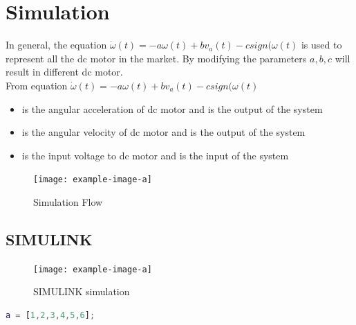 \documentclass[12pt,a4paper]{article}
\begin{document}
	\section{Simulation}
	
	In general, the equation \(\dot{\omega}(t) = - a\omega(t) + bv_a(t) - csign(\omega(t)\) is used to represent all the dc motor in the market. By modifying the parameters \(a, b, c\) will result in different dc motor.\\
	
	From equation \(\dot{\omega}(t) = - a\omega(t) + bv_a(t) - csign(\omega(t)\)
	\begin{itemize}
		\item { is the angular acceleration of dc motor and is the output of the system}
		\item { is the angular velocity of dc motor and is the output of the system}
		\item { is the input voltage to dc motor and is the input of the system}
	\end{itemize}
	
	\begin{figure}[ht]
		\centering
		\texttt{[image: example-image-a]}
		\caption{Simulation Flow}
		\label{fig:Simulation Flow}
	\end{figure}
	
	\subsection{SIMULINK}
	
	\begin{figure}[ht]
		\centering
		\texttt{[image: example-image-a]}
		\caption{SIMULINK simulation}
		\label{fig:SIMULINK simulation}
	\end{figure}
	
	\begin{lstlisting}[language=MATLAB]
		a = [1,2,3,4,5,6];
	\end{lstlisting}
	
\end{document}
